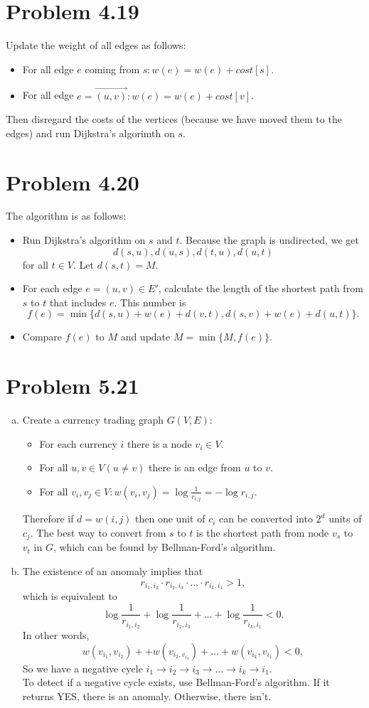 \documentclass[12pt]{report}
\begin{document}
\section{Problem 4.19}
Update the weight of all edges as follows:
\begin{itemize}
  \item For all edge $e$ coming from $s: w(e) = w(e) + cost[s]$.
  \item For all edge $e = \overrightarrow{(u,v)}: w(e) = w(e) + cost[v]$.
\end{itemize}
Then disregard the costs of the vertices (because we have moved them to the edges) and run Dijkstra's algorimth on $s$.

\section{Problem 4.20}
The algorithm is as follows:
\begin{itemize}
  \item Run Dijkstra's algorithm on $s$ and $t$. Because the graph is undirected, we get $$d(s,u), d(u,s), d(t,u), d(u,t)$$ for all $t \in V$. Let $d(s,t) = M$.
  \item For each edge $e = (u,v) \in E'$, calculate the length of the shortest path from $s$ to $t$ that includes $e$. This number is $$f(e) = \min \{ d(s,u) + w(e) + d(v,t), d(s,v) + w(e) + d(u,t) \}.$$
  \item Compare $f(e)$ to $M$ and update $M = \min \{ M, f(e) \}$.
\end{itemize}

\section{Problem 5.21}
\begin{enumerate}[(a)]
\item Create a currency trading graph $G(V,E)$:
\begin{itemize}
  \item For each currency $i$ there is a node $v_i \in V$.
  \item For all $u, v \in V (u \ne v)$ there is an edge from $u$ to $v$.
  \item For all $v_i, v_j \in V: w(v_i, v_j) = \log \frac{1}{r_{i,j}} = - \log r_{i,j}$.
\end{itemize}
Therefore if $d = w(i,j)$ then one unit of $c_i$ can be converted into $2^d$ units of $c_j$.
The best way to convert from $s$ to $t$ is the shortest path from node $v_s$ to $v_t$ in $G$, which can be found by Bellman-Ford's algorithm.

\item
The existence of an anomaly implies that $$r_{i_1, i_2} \cdot r_{i_2, i_3} \cdot \ldots \cdot r_{i_k, i_1} > 1,$$
which is equivalent to $$\log \frac{1}{r_{i_1, i_2}} +  \log \frac{1}{r_{i_2, i_3}} +  \ldots + \log \frac{1}{r_{i_k, i_1}} < 0.$$
In other words, $$w(v_{i_1}, v_{i_2}) + + w(v_{i_2, v_{i_3}}) + \ldots + w(v_{i_k}, v_{i_1}) < 0,$$
So we have a negative cycle $i_1 \to i_2 \to i_3 \to \ldots \to i_k \to i_1.$ \\
To detect if a negative cycle exists, use Bellman-Ford's algorithm. If it returns YES, there is an anomaly. Otherwise, there isn't.
\end{enumerate}
\end{document}

